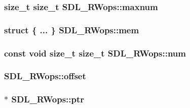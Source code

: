 \hypertarget{struct_s_d_l___r_wops_a7786282ec28451085908f70048ee32c8}{
\subsubsection[{maxnum}]{ {\bf size\-\_\-t} {\bf size\-\_\-t} S\-D\-L\-\_\-\-R\-Wops\-::maxnum}}\label{struct_s_d_l___r_wops_a7786282ec28451085908f70048ee32c8}
\hypertarget{struct_s_d_l___r_wops_a830ef39b29712325ee60d2c09190fdfe}{
\subsubsection[{mem}]{\setlength{\rightskip}{0pt plus 5cm}struct \{ ... \}   S\-D\-L\-\_\-\-R\-Wops\-::mem}}\label{struct_s_d_l___r_wops_a830ef39b29712325ee60d2c09190fdfe}
\hypertarget{struct_s_d_l___r_wops_a630921d5c84cf48a4a10f9a75e1caa10}{
\subsubsection[{num}]{\setlength{\rightskip}{0pt plus 5cm}const {\bf void} {\bf size\-\_\-t} {\bf size\-\_\-t} S\-D\-L\-\_\-\-R\-Wops\-::num}}\label{struct_s_d_l___r_wops_a630921d5c84cf48a4a10f9a75e1caa10}
\hypertarget{struct_s_d_l___r_wops_ab1ee9d9e4f61b3b30f26160c282ae416}{
\subsubsection[{offset}]{ S\-D\-L\-\_\-\-R\-Wops\-::offset}}\label{struct_s_d_l___r_wops_ab1ee9d9e4f61b3b30f26160c282ae416}
\hypertarget{struct_s_d_l___r_wops_a3f68b93789331775de802d51a2934f0a}{
\subsubsection[{ptr}]{$\ast$ S\-D\-L\-\_\-\-R\-Wops\-::ptr}}\label{struct_s_d_l___r_wops_a3f68b93789331775de802d51a2934f0a}
